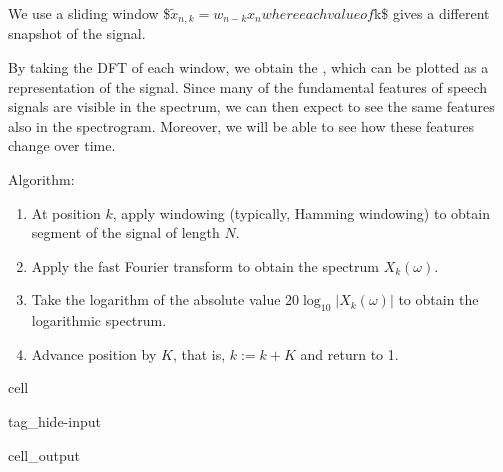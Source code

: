 \documentclass[letterpaper,10pt,english]{jupyterBook}
\begin{document}
\sphinxAtStartPar
We use a sliding window
\$\(
\tilde x_{n,k} = w_{n-k} x_n
\)\(
where each value of \)k\$ gives a different snapshot of the signal.

\sphinxAtStartPar
By taking the DFT of each window, we obtain the , which can be plotted as a \sphinxhyphen{}representation of the signal. Since many of the fundamental features of speech signals are visible in the spectrum, we can then expect to see the same features also in the spectrogram. Moreover, we will be able to see how these features change over time.

\sphinxAtStartPar
Algorithm:
\begin{enumerate}
%
\item {} 
\sphinxAtStartPar
At position \(k\), apply windowing (typically, Hamming windowing)
to obtain segment of the signal of length \(N\).

\item {} 
\sphinxAtStartPar
Apply the fast Fourier transform to obtain the spectrum \(X_k(\omega)\).

\item {} 
\sphinxAtStartPar
Take the logarithm of the absolute value \(20\log_{10}|X_k(\omega)|\) to obtain
the logarithmic spectrum.

\item {} 
\sphinxAtStartPar
Advance position by \(K\), that is, \(k:=k+K\) and return to 1.

\end{enumerate}

\begin{sphinxuseclass}{cell}
\begin{sphinxuseclass}{tag_hide-input}\begin{sphinxVerbatimOutput}

\begin{sphinxuseclass}{cell_output}
\noindent{}

\noindent{}

\end{sphinxuseclass}\end{sphinxVerbatimOutput}

\end{sphinxuseclass}
\end{sphinxuseclass}
\end{document}
